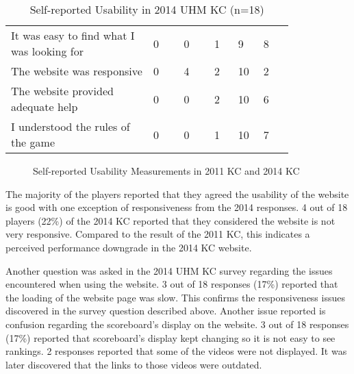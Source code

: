 \begin{table}[ht!]
  \centering
  \begin{tabular} {|P{0.42\linewidth}|P{0.09\linewidth}|p{0.09\linewidth}|p{0.075\linewidth}|p{0.06\linewidth}|P{0.09\linewidth}|}
    \hline
    \centering {} &  &  &  &  & \\
    \hline
It was easy to find what I was looking for & 0 & 0 & 1 & 9 & 8\\
    \hline
The website was responsive & 0 & 4 & 2 & 10 & 2 \\
    \hline
The website provided adequate help & 0 & 0 & 2 & 10 & 6 \\
    \hline
I understood the rules of the game & 0 & 0 & 1 & 10 & 7 \\
    \hline 
  \end{tabular}
  \caption{Self-reported Usability in 2014 UHM KC (n=18)}
  \label{table:self-report-usability-2014}
\end{table}

\begin{figure}[ht!]
	\centering
		\caption{Self-reported Usability Measurements in 2011 KC and 2014 KC}
		\label{fig:self-report-usability-2011-2014}
\end{figure}

The majority of the players reported that they agreed the usability of the website is good with one exception of responsiveness from the 2014 responses. 4 out of 18 players (22\%) of the 2014 KC reported that they considered the website is not very responsive. Compared to the result of the 2011 KC, this indicates a perceived performance downgrade in the 2014 KC website.

Another question was asked in the 2014 UHM KC survey regarding the issues encountered when using the website. 3 out of 18 responses (17\%) reported that the loading of the website page was slow. This confirms the responsiveness issues discovered in the survey question described above. Another issue reported is confusion regarding the scoreboard's display on the website. 3 out of 18 responses (17\%) reported that scoreboard's display kept changing so it is not easy to see rankings. 2 responses reported that some of the videos were not displayed. It was later discovered that the links to those videos were outdated.


